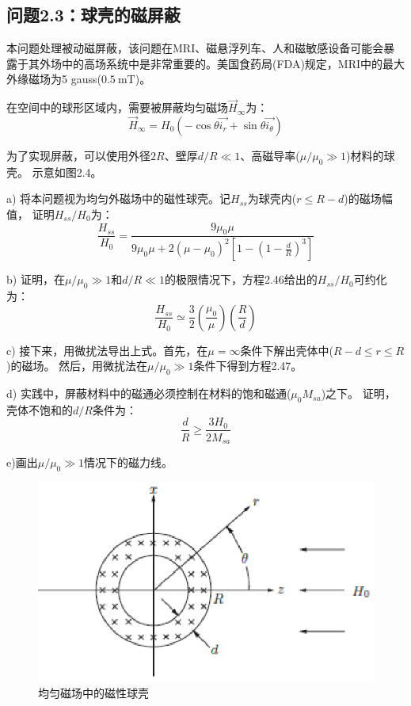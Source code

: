 \subsection{问题2.3：球壳的磁屏蔽}
本问题处理被动磁屏蔽，该问题在MRI、磁悬浮列车、人和磁敏感设备可能会暴露于其外场中的高场系统中是非常重要的。美国食药局(FDA)规定，MRI中的最大外缘磁场为5 gauss($0.5\ \mathrm{mT}$)。

在空间中的球形区域内，需要被屏蔽均匀磁场$\vec{H}_\infty$为：
\begin{equation*}
\vec{H}_\infty=H_0 (-\cos\theta \vec{i_r}+\sin\theta \vec{i_\theta})\tag{2.40}
\end{equation*}

为了实现屏蔽，可以使用外径$2R$、壁厚$d/R\ll 1$、高磁导率($\mu/\mu_0 \gg 1$)材料的球壳。
示意如图2.4。

a) 将本问题视为均匀外磁场中的磁性球壳。记$H_{ss}$为球壳内($r\le R-d$)的磁场幅值，
证明$H_{ss}/H_0$为：
\begin{equation}
\frac{H_{ss}}{H_0}=\frac{9\mu_0 \mu}{9\mu_0 \mu+2(\mu-\mu_0)^2\left[1-\left(1-\frac{d}{R}\right)^3\right]}
\end{equation}

b) 证明，在$\mu/\mu_0\gg 1$和$d/R\ll 1$的极限情况下，方程2.46给出的$H_{ss}/H_0$可约化为：
\begin{equation}
\frac{H_{ss}}{H_0}\simeq \frac{3}{2}\left(\frac{\mu_0}{\mu}\right)\left(\frac{R}{d}\right)
\end{equation}

c) 接下来，用微扰法导出上式。首先，在$\mu=\infty$条件下解出壳体中($R-d\le r\le R$)的磁场。
然后，用微扰法在$\mu/\mu_0 \gg 1$条件下得到方程2.47。

d) 实践中，屏蔽材料中的磁通必须控制在材料的饱和磁通($\mu_0 M_{sa}$)之下。
证明，壳体不饱和的$d/R$条件为：
\begin{equation}
\frac{d}{R} \ge \frac{3H_0}{2M_{sa}}
\end{equation}

e)画出$\mu/\mu_0 \gg 1$情况下的磁力线。

\begin{figure}[htbp]
  \centering
 \includegraphics[scale=0.9]{chpt2/figs/fig2.4.eps}
  \caption{均匀磁场中的磁性球壳}
\end{figure}

